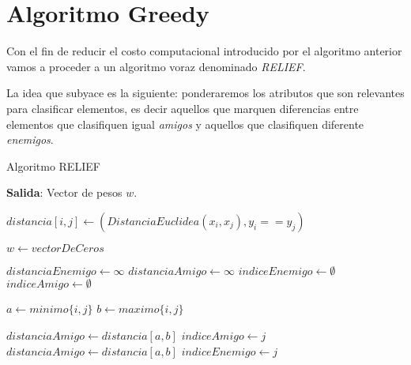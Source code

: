
\section{Algoritmo Greedy}

Con  el fin de reducir el costo computacional 
introducido por el algoritmo anterior vamos a proceder a un algoritmo voraz denominado 
\textit{RELIEF}.

La idea que subyace es la siguiente: ponderaremos los atributos que son relevantes 
para clasificar elementos, es decir aquellos que marquen diferencias entre elementos que clasifiquen igual \textit{amigos} y aquellos que clasifiquen diferente \textit{enemigos}.

\begin{algorithm}[H]
    \caption{Algoritmo RELIEF}
        \hspace*{\algorithmicindent} 
        \textbf{Salida}:
        Vector de pesos $w$.        
    \begin{algorithmic}[1]

          \State $distancia[i,j] \gets (DistanciaEuclidea(x_i,x_j), y_i == y_j) $ 
    \EndFor

    \State $w \gets vectorDeCeros$ 

    \State $distanciaEnemigo \gets \infty$
    \State $distanciaAmigo \gets \infty$
    \State $indiceEnemigo \gets \emptyset$
    \State $indiceAmigo \gets \emptyset$
    
            \State $a \gets minimo\{i,j\}$
            \State $b \gets maximo\{i,j\}$

                    \State $distanciaAmigo \gets distancia[a,b]$
                    \State $indiceAmigo \gets j$
                \EndIf
            \EndIf
                    \State $distanciaAmigo \gets distancia[a,b]$
                    \State $indiceEnemigo \gets j$
                \EndIf
            \EndIf
            

\end{algorithmic}
\end{algorithm}
